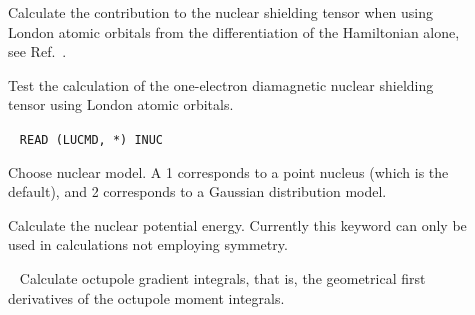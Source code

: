 \begin{description}
\item[] Calculate the contribution to the nuclear
shielding tensor when using London atomic orbitals from the 
differentiation of the Hamiltonian alone, see Ref.~\cite{thpjjcp95}.


\item[] Test the calculation of the one-electron
diamagnetic  nuclear shielding
tensor using London atomic orbitals.

\item[]\verb| |\newline
\verb|READ (LUCMD, *) INUC|

Choose nuclear model. A 1 corresponds to a point nucleus (which is the
default), and 2 corresponds to a Gaussian distribution model.

\item[] Calculate the nuclear potential energy.
Currently this keyword can only be used in calculations not employing
symmetry.


\item[]\verb| |\newline
Calculate octupole gradient integrals, that is, the geometrical first
derivatives of the octupole moment integrals.


\end{description}

